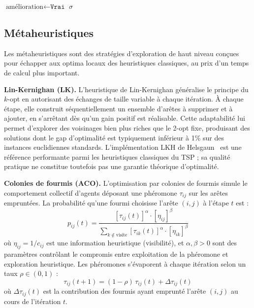 \documentclass[12pt, a4paper, twoside, openright]{book}
\begin{document}
\begin{algorithm}[htbp]
	\caption{Amélioration 2-opt}
	\label{alg:2opt}
	$\text{amélioration} \leftarrow \texttt{Vrai}$ \;
	\Return $\sigma$
\end{algorithm}
	\subsection{M\'etaheuristiques}
	\label{subsec:tsp_meta}
	
	Les métaheuristiques sont des stratégies d'exploration de haut niveau
	conçues pour échapper aux optima locaux des heuristiques classiques, au
	prix d'un temps de calcul plus important.
	
	\textbf{Lin-Kernighan (LK).}
	L'heuristique de Lin-Kernighan généralise le principe du $k$-opt en
	autorisant des échanges de taille variable à chaque itération. À chaque
	étape, elle construit séquentiellement un ensemble d'arêtes à supprimer et
	à ajouter, en s'arrêtant dès qu'un gain positif est réalisable. Cette
	adaptabilité lui permet d'explorer des voisinages bien plus riches que le
	2-opt fixe, produisant des solutions dont le gap d'optimalité est
	typiquement inférieur à 1\% sur des instances euclidiennes standards.
	L'implémentation LKH de Helsgaun~\cite{helsgaun2000effective} est une référence performante parmi les heuristiques
	classiques du TSP ; sa qualité pratique ne constitue toutefois pas une garantie
	théorique d'optimalité.
	
	\textbf{Colonies de fourmis (ACO).}
	L'optimisation par colonies de fourmis simule le comportement collectif
	d'agents déposant une phéromone $\tau_{ij}$ sur les arêtes empruntées.
	La probabilité qu'une fourmi choisisse l'arête $(i,j)$ à l'étape $t$ est :
	$$
	p_{ij}(t) = \frac{[\tau_{ij}(t)]^\alpha \cdot [\eta_{ij}]^\beta}
	{\displaystyle\sum_{k \notin \text{visite}} [\tau_{ik}(t)]^\alpha
		\cdot [\eta_{ik}]^\beta}
	$$
	où $\eta_{ij} = 1/c_{ij}$ est une information heuristique (visibilité),
	et $\alpha, \beta > 0$ sont des paramètres contrôlant le compromis entre
	exploitation de la phéromone et exploration heuristique. Les phéromones
	s'évaporent à chaque itération selon un taux $\rho \in (0,1)$ :
	$$
	\tau_{ij}(t+1) = (1-\rho)\,\tau_{ij}(t) + \Delta\tau_{ij}(t)
	$$
	où $\Delta\tau_{ij}(t)$ est la contribution des fourmis ayant emprunté
	l'arête $(i,j)$ au cours de l'itération $t$.
	
\end{document}
